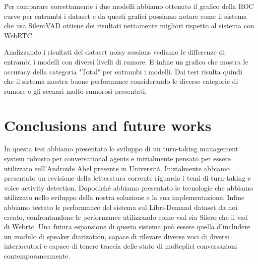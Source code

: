 \documentclass[12pt]{article}
\begin{document}
Per comparare correttamente i due modelli abbiamo ottenuto il grafico della ROC curve per entrambi i dataset e da questi grafici possiamo notare come il sistema che usa SileroVAD ottiene dei risultati nettamente migliori rispetto al sistema con WebRTC.

Analizzando i risultati del dataset noisy sessions vediamo le differenze di entrambi i modelli con diversi livelli di rumore. E infine un grafico che mostra le accuracy della categoria "Total" per entrambi i modelli. Dai test risulta quindi che il sistema mostra buone performance considerando le diverse categorie di rumore e gli scenari molto rumorosi presentati. 

\section{Conclusions and future works}

In questa tesi abbiamo presentato lo sviluppo di un turn-taking management system robusto per conversational agents e inizialmente pensato per essere utilizzato sull'Androide Abel presente in Università. Inizialmente abbiamo presentato un revisione della letteratura corrente riguardo i temi di turn-taking e voice activity detection. Dopodiché abbiamo presentato le tecnologie che abbiamo utilizzato nello sviluppo della nostra soluzione e la sua implementazione. Infine abbiamo testato le performance del sistema sul Libri-Demand dataset da noi creato, confrontandone le performance utilizzando come vad sia Silero che il vad di Webrtc. Una futura espansione di questo sistema può essere quella d'includere un modulo di speaker diarization, capace di rilevare diverse voci di diversi interlocutori e capace di tenere traccia delle stato di molteplici conversazioni contemporaneamente.
\end{document}
